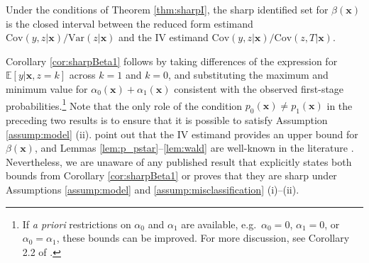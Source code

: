 \begin{cor}
  Under the conditions of Theorem \ref{thm:sharpI}, the sharp identified set for $\beta(\mathbf{x})$ is the closed interval between the reduced form estimand $\mbox{Cov}(y,z|\mathbf{x})/\mbox{Var}(z|\mathbf{x})$ and the IV estimand $\mbox{Cov}(y,z|\mathbf{x})/\mbox{Cov}(z,T|\mathbf{x})$.
\label{cor:sharpBeta1}
\end{cor}

Corollary \ref{cor:sharpBeta1} follows by taking differences of the expression for $\mathbb{E}[y|\mathbf{x},z=k]$ across $k=1$ and $k=0$, and substituting the maximum and minimum value for $\alpha_0(\mathbf{x}) + \alpha_1(\mathbf{x})$ consistent with the observed first-stage probabilities.\footnote{If \emph{a priori} restrictions on $\alpha_0$ and $\alpha_1$ are available, e.g.\ $\alpha_0 = 0$, $\alpha_1 = 0$, or $\alpha_0 = \alpha_1$, these bounds can be improved. For more discussion, see Corollary 2.2 of \cite{DiTragliaGarciaWP2017}.}
Note that the only role of the condition $p_0(\mathbf{x}) \neq p_1(\mathbf{x})$ in the preceding two results is to ensure that it is possible to satisfy Assumption \ref{assump:model} (ii).
\cite{FL} point out that the IV estimand provides an upper bound for $\beta(\mathbf{x})$, and Lemmas \ref{lem:p_pstar}--\ref{lem:wald} are well-known in the literature \citep[see e.g.][]{FL,Mahajan}.
Nevertheless, we are unaware of any published result that explicitly states both bounds from Corollary \ref{cor:sharpBeta1} or proves that they are sharp under Assumptions \ref{assump:model} and \ref{assump:misclassification} (i)--(ii).
